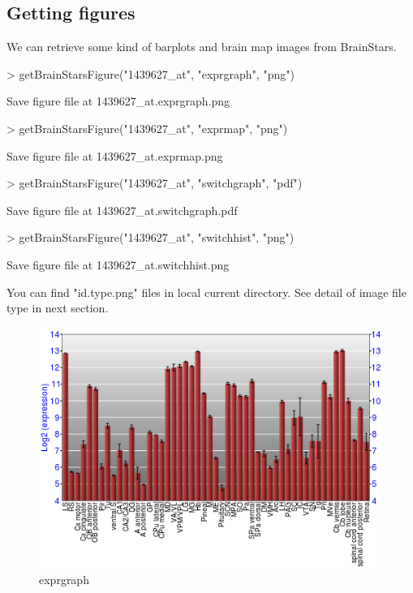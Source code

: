 \documentclass[12pt,fullpage]{article}
\begin{document}
\subsection{Getting figures}
We can retrieve some kind of barplots and brain map images from BrainStars.

\begin{Schunk}
\begin{Sinput}
> getBrainStarsFigure("1439627_at", "exprgraph",   "png")
\end{Sinput}
\begin{Soutput}
Save figure file at 1439627_at.exprgraph.png 
\end{Soutput}
\begin{Sinput}
> getBrainStarsFigure("1439627_at", "exprmap",     "png")
\end{Sinput}
\begin{Soutput}
Save figure file at 1439627_at.exprmap.png 
\end{Soutput}
\begin{Sinput}
> getBrainStarsFigure("1439627_at", "switchgraph", "pdf")
\end{Sinput}
\begin{Soutput}
Save figure file at 1439627_at.switchgraph.pdf 
\end{Soutput}
\begin{Sinput}
> getBrainStarsFigure("1439627_at", "switchhist",  "png")
\end{Sinput}
\begin{Soutput}
Save figure file at 1439627_at.switchhist.png 
\end{Soutput}
\end{Schunk}

You can find "id.type.png" files in local current directory. See detail of image file type in next section.

\begin{figure}
  \centering
  \includegraphics{exprgraph.png}
  \caption{exprgraph}
\end{figure}
\end{document}
